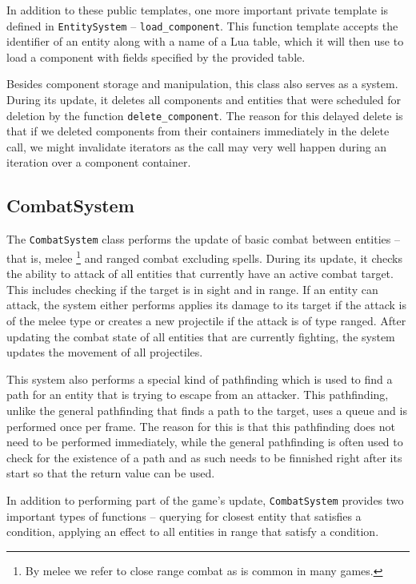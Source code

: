 In addition to these public templates, one more important private template is defined in \texttt{EntitySystem} -- \texttt{load\_component}.
This function template accepts the identifier of an entity along with a name of a Lua table, which it will then use to load a component
with fields specified by the provided table.

Besides component storage and manipulation, this class also serves as a system. During its update, it deletes all components and entities
that were scheduled for deletion by the function \texttt{delete\_component}. The reason for this delayed delete is that if we deleted
components from their containers immediately in the delete call, we might invalidate iterators as the call may very well happen during
an iteration over a component container.

\subsection{CombatSystem}

The \texttt{CombatSystem} class performs the update of basic combat between entities -- that is,
melee \footnote{By melee we refer to close range combat as is common in many games.} and ranged combat excluding spells.
During its update, it checks the ability to attack of all entities that currently have an active combat target. This includes checking
if the target is in sight and in range. If an entity can attack, the system either performs applies its damage to its target if the
attack is of the melee type or creates a new projectile if the attack is of type ranged.
After updating the combat state of all entities that are currently fighting, the system updates the movement of all projectiles.

This system also performs a special kind of pathfinding which is used to find a path for an entity that is trying to escape from an attacker.
This pathfinding, unlike the general pathfinding that finds a path to the target, uses a queue and is performed once per frame. The reason for
this is that this pathfinding does not need to be performed immediately, while the general pathfinding is often used to check for the
existence of a path and as such needs to be finnished right after its start so that the return value can be used.

In addition to performing part of the game's update, \texttt{CombatSystem} provides two important types of functions -- querying for closest
entity that satisfies a condition, applying an effect to all entities in range that satisfy a condition.

